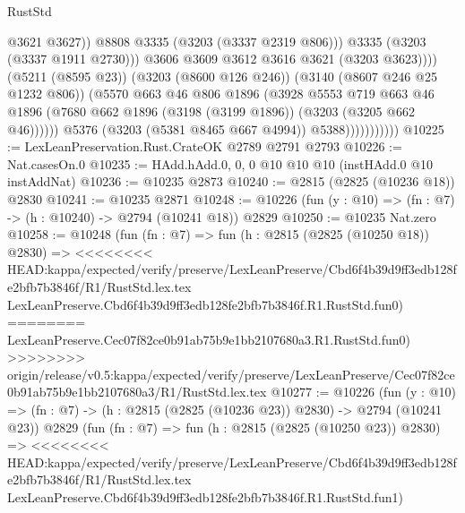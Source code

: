 \begin{lexlean}{RustStd}
\begin{coremodule}
{\begin{coremodule}
{{{{{{{{{{{{{{{                                          @3621
                                          @3627))
                                      @8808
                                      @3335
                                      (@3203 (@3337 @2319 @806)))
                                    @3335
                                    (@3203 (@3337 @1911 @2730)))
                                  @3606
                                  @3609
                                  @3612
                                  @3616
                                  @3621
                                  (@3203 @3623))))
                            (@5211 (@8595 @23))
                            (@3203 (@8600 @126 @246))
                            (@3140 (@8607 @246 @25 @1232 @806))
                            (@5570
                              @663
                              @46
                              @806
                              @1896
                              (@3928
                                @5553
                                @719
                                @663
                                @46
                                @1896
                                (@7680 @662 @1896 (@3198 (@3199 @1896)) (@3203 (@3205 @662 @46))))))
                          @5376
                          (@3203 (@5381 @8465 @667 @4994))
                          @5388)))))))))))
@10225 := LexLeanPreservation.Rust.CrateOK @2789 @2791 @2793
@10226 := Nat.casesOn.{0}
@10235 := HAdd.hAdd.{0, 0, 0} @10 @10 @10 (instHAdd.{0} @10 instAddNat)
@10236 := @10235 @2873
@10240 := @2815 (@2825 (@10236 @18)) @2830
@10241 := @10235 @2871
@10248 := @10226 (fun (y : @10) => (fn : @7) -> (h : @10240) -> @2794 (@10241 @18)) @2829
@10250 := @10235 Nat.zero
@10258 := @10248
    (fun (fn : @7) =>
    fun (h : @2815 (@2825 (@10250 @18)) @2830) =>
<<<<<<<< HEAD:kappa/expected/verify/preserve/LexLeanPreserve/Cbd6f4b39d9ff3edb128fe2bfb7b3846f/R1/RustStd.lex.tex
    LexLeanPreserve.Cbd6f4b39d9ff3edb128fe2bfb7b3846f.R1.RustStd.fun0)
========
    LexLeanPreserve.Cec07f82ce0b91ab75b9e1bb2107680a3.R1.RustStd.fun0)
>>>>>>>> origin/release/v0.5:kappa/expected/verify/preserve/LexLeanPreserve/Cec07f82ce0b91ab75b9e1bb2107680a3/R1/RustStd.lex.tex
@10277 := @10226
    (fun (y : @10) => (fn : @7) -> (h : @2815 (@2825 (@10236 @23)) @2830) -> @2794 (@10241 @23))
    @2829
    (fun (fn : @7) =>
    fun (h : @2815 (@2825 (@10250 @23)) @2830) =>
<<<<<<<< HEAD:kappa/expected/verify/preserve/LexLeanPreserve/Cbd6f4b39d9ff3edb128fe2bfb7b3846f/R1/RustStd.lex.tex
    LexLeanPreserve.Cbd6f4b39d9ff3edb128fe2bfb7b3846f.R1.RustStd.fun1)
}}}}}}}}}}}}}}}
\end{coremodule}}
\end{coremodule}
\end{lexlean}
